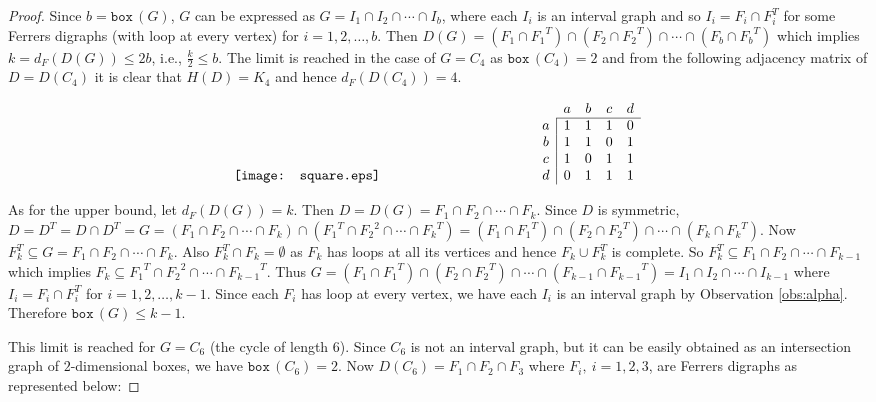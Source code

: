 \documentclass[11pt]{article}
\theoremstyle{definition}
\theoremstyle{remark}
\numberwithin{equation}{section}
\newcommand{\BOX}[1]{\texttt{box}\,(#1)}
\begin{document}
\begin{proof}
Since $b = \BOX{G}$, $G$ can be expressed as $G = I_1 \cap I_2 \cap \cdots \cap I_b$, where each $I_i$ is an interval graph and so $I_i=F_i\cap F^T_i$ for some Ferrers digraphs (with loop at every vertex) for $i=1,2,\ldots ,b$. Then $D(G)= (F_1 \cap {F_1}^T) \cap (F_2 \cap {F_2}^T) \cap \cdots \cap (F_b \cap {F_b}^T)$ which implies $k=d_F(D(G))\leqslant 2b$, i.e., $\frac{k}{2}\leqslant b$. The limit is reached in the case of $G=C_4$ as $\BOX{C_4}=2$ and from the following adjacency matrix of $D=D(C_4)$ it is clear that $H(D)=K_4$ and hence $d_F(D(C_4))=4$.

$$\begin{array}{cc}
\texttt{[image: square.eps]} & \hspace{1.4in} 
\begin{array}[b]{c|cccc}
\multicolumn{1}{c}{} & a & b & c & d \\ \cline{2-5}
a & 1 & 1 & 1 & 0 \\
b & 1 & 1 & 0 & 1 \\
c & 1 & 0 & 1 & 1 \\
d & 0 & 1 & 1 & 1 
\end{array}
\end{array}$$

\vspace{1em}As for the upper bound, let $d_F(D(G))=k$. Then $D=D(G) = F_1 \cap F_2 \cap \cdots \cap F_k$. Since $D$ is symmetric, $D=D^T=D\cap D^T=G=(F_1 \cap F_2 \cap \cdots \cap F_k) \cap ({F_1}^T \cap {F_2}^2 \cap \cdots \cap {F_k}^T)=(F_1 \cap {F_1}^T) \cap (F_2 \cap {F_2}^T) \cap \cdots \cap (F_{k} \cap {F_{k}}^T)$. Now $F_k^T\subseteq G=F_1 \cap F_2 \cap \cdots \cap F_k$. Also $F_k^T\cap F_k=\emptyset$ as $F_k$ has loops at all its vertices and hence $F_k\cup F_k^T$ is complete. So $F_k^T\subseteq F_1 \cap F_2 \cap \cdots \cap F_{k-1}$ which implies $F_k\subseteq {F_1}^T \cap {F_2}^2 \cap \cdots \cap {F_{k-1}}^T$. Thus $G=(F_1 \cap {F_1}^T) \cap (F_2 \cap {F_2}^T) \cap \cdots \cap (F_{k-1} \cap {F_{k-1}}^T)=I_1 \cap I_2 \cap \cdots \cap I_{k-1}$ where $I_i=F_i\cap F_i^T$ for $i=1,2,\ldots ,k-1$. Since each $F_i$ has loop at every vertex, we have each $I_i$ is an interval graph by Observation \ref{obs:alpha}. Therefore $\BOX{G}\leqslant k-1$.

\vspace{1em} This limit is reached for $G=C_6$ (the cycle of length 6). Since $C_6$ is not an interval graph, but it can be easily obtained as an intersection graph of $2$-dimensional boxes, we have $\BOX{C_6}=2$. Now $D(C_6)=F_1\cap F_2\cap F_3$ where $F_i,\ i=1,2,3$, are Ferrers digraphs as represented below:


\end{proof}
\end{document}
